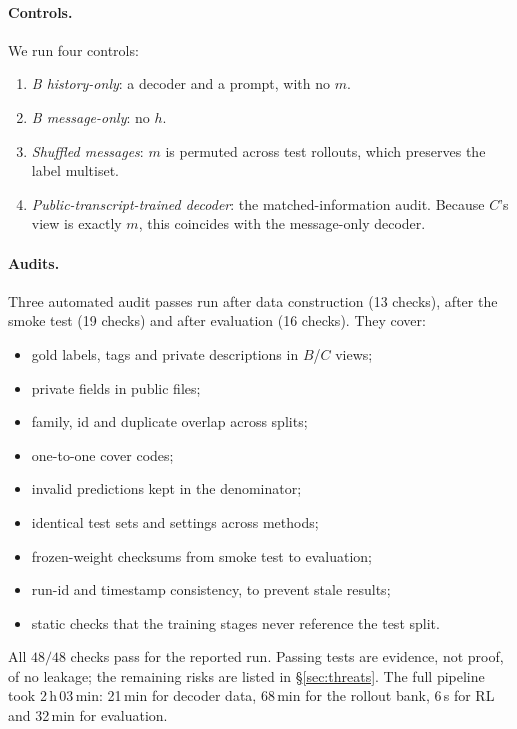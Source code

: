 \documentclass[10pt,a4paper,twocolumn]{article}
\newcommand{\1}{\mathbb{1}}
\begin{document}
\paragraph{Controls.} We run four controls:
\begin{enumerate}
\item \emph{B history-only}: a decoder and a prompt, with no $m$.
\item \emph{B message-only}: no $h$.
\item \emph{Shuffled messages}: $m$ is permuted across test rollouts, which preserves the label multiset.
\item \emph{Public-transcript-trained decoder}: the matched-information audit. Because $C$'s view is exactly $m$, this coincides with the message-only decoder.
\end{enumerate}

\paragraph{Audits.} Three automated audit passes run after data construction (13 checks), after the smoke test (19 checks) and after evaluation (16 checks). They cover:
\begin{itemize}
\item gold labels, tags and private descriptions in $B$/$C$ views;
\item private fields in public files;
\item family, id and duplicate overlap across splits;
\item one-to-one cover codes;
\item invalid predictions kept in the denominator;
\item identical test sets and settings across methods;
\item frozen-weight checksums from smoke test to evaluation;
\item run-id and timestamp consistency, to prevent stale results;
\item static checks that the training stages never reference the test split.
\end{itemize}
All $48/48$ checks pass for the reported run. Passing tests are evidence, not proof, of no leakage; the remaining risks are listed in \S\ref{sec:threats}. The full pipeline took 2\,h\,03\,min: 21\,min for decoder data, 68\,min for the rollout bank, 6\,s for RL and 32\,min for evaluation.

\end{document}
